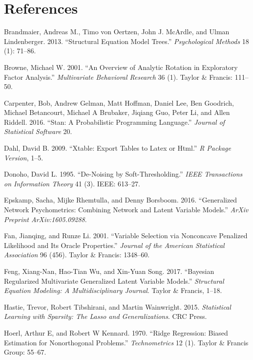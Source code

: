 \documentclass[article]{jss}
\begin{document}
\section*{References}\label{references}

\hypertarget{refs}{}
\hypertarget{ref-brandmaier2013}{}
Brandmaier, Andreas M., Timo von Oertzen, John J. McArdle, and Ulman
Lindenberger. 2013. ``Structural Equation Model Trees.''
\emph{Psychological Methods} 18 (1): 71--86.

\hypertarget{ref-browne2001}{}
Browne, Michael W. 2001. ``An Overview of Analytic Rotation in
Exploratory Factor Analysis.'' \emph{Multivariate Behavioral Research}
36 (1). Taylor \& Francis: 111--50.

\hypertarget{ref-carpenter2016stan}{}
Carpenter, Bob, Andrew Gelman, Matt Hoffman, Daniel Lee, Ben Goodrich,
Michael Betancourt, Michael A Brubaker, Jiqiang Guo, Peter Li, and Allen
Riddell. 2016. ``Stan: A Probabilistic Programming Language.''
\emph{Journal of Statistical Software} 20.

\hypertarget{ref-dahl2009xtable}{}
Dahl, David B. 2009. ``Xtable: Export Tables to Latex or Html.'' \emph{R
Package Version}, 1--5.

\hypertarget{ref-donoho1995noising}{}
Donoho, David L. 1995. ``De-Noising by Soft-Thresholding.'' \emph{IEEE
Transactions on Information Theory} 41 (3). IEEE: 613--27.

\hypertarget{ref-epskamp2016generalized}{}
Epskamp, Sacha, Mijke Rhemtulla, and Denny Borsboom. 2016. ``Generalized
Network Psychometrics: Combining Network and Latent Variable Models.''
\emph{ArXiv Preprint ArXiv:1605.09288}.

\hypertarget{ref-fan2001variable}{}
Fan, Jianqing, and Runze Li. 2001. ``Variable Selection via Nonconcave
Penalized Likelihood and Its Oracle Properties.'' \emph{Journal of the
American Statistical Association} 96 (456). Taylor \& Francis: 1348--60.

\hypertarget{ref-feng2017bayesian}{}
Feng, Xiang-Nan, Hao-Tian Wu, and Xin-Yuan Song. 2017. ``Bayesian
Regularized Multivariate Generalized Latent Variable Models.''
\emph{Structural Equation Modeling: A Multidisciplinary Journal}. Taylor
\& Francis, 1--18.

\hypertarget{ref-hastie2015statistical}{}
Hastie, Trevor, Robert Tibshirani, and Martin Wainwright. 2015.
\emph{Statistical Learning with Sparsity: The Lasso and
Generalizations}. CRC Press.

\hypertarget{ref-hoerl1970}{}
Hoerl, Arthur E, and Robert W Kennard. 1970. ``Ridge Regression: Biased
Estimation for Nonorthogonal Problems.'' \emph{Technometrics} 12 (1).
Taylor \& Francis Group: 55--67.
\end{document}
